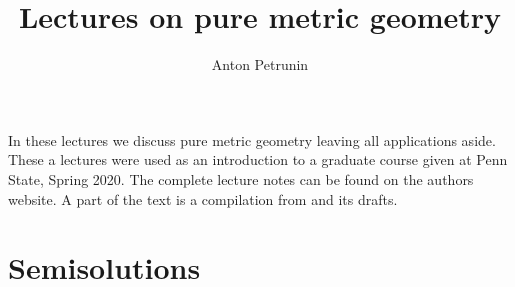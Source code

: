 \documentclass[twoside]{book}
\begin{document}
 
\title{Lectures on pure metric geometry}
\author{Anton Petrunin}
\date{}
\maketitle

In these lectures we discuss pure metric geometry leaving all applications aside.
These a lectures were used as an introduction to a graduate course given at Penn State, Spring 2020.
The complete lecture notes can be found on the authors website.
A part of the text is a compilation from \cite{alexander-kapovitch-petrunin-2019, alexander-kapovitch-petrunin-2025, petrunin-yashinski, petrunin-2009, petrunin-zamorabarrera} and its drafts.

\thispagestyle{empty}
\tableofcontents
\thispagestyle{empty}





%


\appendix
\chapter{Semisolutions}






{\small\sloppy


\printbibliography[heading=bibintoc]
\fussy
}
\end{document}
